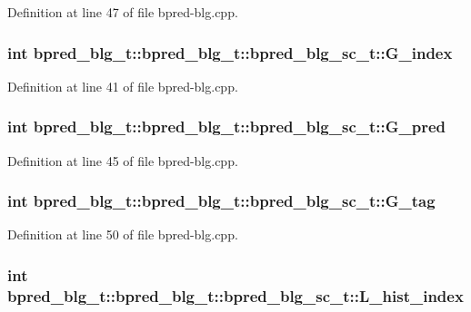 Definition at line 47 of file bpred-blg.cpp.
\subsubsection[{G\_\-index}]{\setlength{\rightskip}{0pt plus 5cm}int bpred\_\-blg\_\-t::bpred\_\-blg\_\-t::bpred\_\-blg\_\-sc\_\-t::G\_\-index}\label{classbpred__blg__t_1_1bpred__blg__sc__t_034abb1e2d4193bcf8b69c9bbf276539}




Definition at line 41 of file bpred-blg.cpp.
\subsubsection[{G\_\-pred}]{\setlength{\rightskip}{0pt plus 5cm}int bpred\_\-blg\_\-t::bpred\_\-blg\_\-t::bpred\_\-blg\_\-sc\_\-t::G\_\-pred}\label{classbpred__blg__t_1_1bpred__blg__sc__t_2bc06b99fc93c338abb2cc6d1bda858d}




Definition at line 45 of file bpred-blg.cpp.
\subsubsection[{G\_\-tag}]{\setlength{\rightskip}{0pt plus 5cm}int bpred\_\-blg\_\-t::bpred\_\-blg\_\-t::bpred\_\-blg\_\-sc\_\-t::G\_\-tag}\label{classbpred__blg__t_1_1bpred__blg__sc__t_b0dc268f1df3a9682139820c2926e1df}




Definition at line 50 of file bpred-blg.cpp.
\subsubsection[{L\_\-hist\_\-index}]{\setlength{\rightskip}{0pt plus 5cm}int bpred\_\-blg\_\-t::bpred\_\-blg\_\-t::bpred\_\-blg\_\-sc\_\-t::L\_\-hist\_\-index}\label{classbpred__blg__t_1_1bpred__blg__sc__t_900c6cc01a12f6fc9c1985a8275a97b5}




